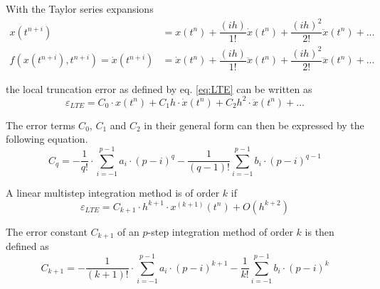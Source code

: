 With the Taylor series expansions
\begin{align}
x\left(t^{n+i}\right) &= x\left(t^{n}\right) + \dfrac{\left(ih\right)}{1!} \dot{x}\left(t^{n}\right) + \dfrac{\left(ih\right)^2}{2!} \ddot{x}\left(t^{n}\right) + \ldots\\
f(x\left(t^{n+i}\right), t^{n+i}) = \dot{x}\left(t^{n+i}\right) &= \dot{x}\left(t^{n}\right) + \dfrac{\left(ih\right)}{1!} \ddot{x}\left(t^{n}\right) + \dfrac{\left(ih\right)^2}{2!} \dddot{x}\left(t^{n}\right) + \ldots
\end{align}

the local truncation error as defined by eq. \eqref{eq:LTE} can be
written as
\begin{equation}
\varepsilon_{LTE} = C_0\cdot x\left(t^n\right) + C_1 h\cdot \dot{x}\left(t^n\right) + C_2 h^2\cdot \ddot{x}\left(t^n\right) + \ldots
\end{equation}

The error terms $C_0$, $C_1$ and $C_2$ in their general form can then
be expressed by the following equation.
\begin{equation}
\label{eq:ErrorConstant}
C_{q} = -\dfrac{1}{q!}\cdot \sum_{i=-1}^{p-1} a_i\cdot \left(p - i\right)^{q} - \dfrac{1}{\left(q - 1\right)!} \sum_{i=-1}^{p-1} b_i\cdot \left(p - i\right)^{q - 1}
\end{equation}

A linear multistep integration method is of order $k$ if
\begin{equation}
\varepsilon_{LTE} = C_{k+1}\cdot h^{k+1}\cdot x^{(k+1)}\left(t^n\right) + O\left(h^{k+2}\right)
\end{equation}

The error constant $C_{k+1}$ of an $p$-step integration method of
order $k$ is then defined as
\begin{equation}
C_{k+1} = -\dfrac{1}{\left(k + 1\right)!}\cdot \sum_{i=-1}^{p-1} a_i\cdot \left(p - i\right)^{k+1} - \dfrac{1}{k!} \sum_{i=-1}^{p-1} b_i\cdot \left(p - i\right)^k
\end{equation}

